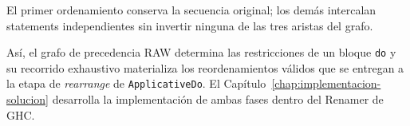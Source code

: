 El primer ordenamiento conserva la secuencia original; los demás intercalan statements independientes sin invertir ninguna de las tres aristas del grafo.

Así, el grafo de precedencia RAW determina las restricciones de un bloque \texttt{do} y su recorrido exhaustivo materializa los reordenamientos válidos que se entregan a la etapa de \textit{rearrange} de \texttt{ApplicativeDo}. El Capítulo~\ref{chap:implementacion-solucion} desarrolla la implementación de ambas fases dentro del Renamer de \textsf{GHC}.
